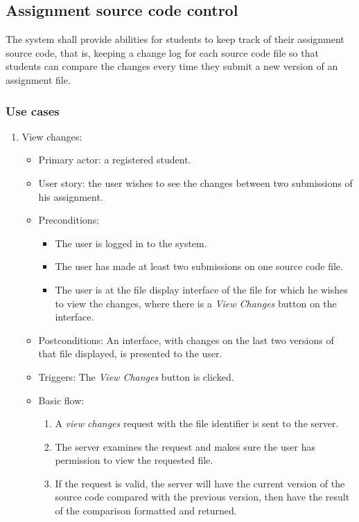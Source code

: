 \subsection{Assignment source code control}
The system shall provide abilities for students to keep track of their
assignment source code, that is, keeping a change log for each source code
file so that students can compare the changes every time they submit a new
version of an assignment file.

\subsubsection{Use cases}
\begin{enumerate}
\item View changes:
\begin{itemize}
    \item Primary actor: a registered student.
    \item User story: the user wishes to see the changes between two
        submissions of his assignment.
    \item Preconditions:
        \begin{itemize}
            \item The user is logged in to the system.
            \item The user has made at least two submissions on one source code
                file.
            \item The user is at the file display interface of the file for
                which he
                wishes to view the changes, where there is a \emph{View Changes}
                button on the interface.
        \end{itemize}
    \item Postconditions:
        An interface, with changes on the last two versions of that file
        displayed, is presented to the user.
    \item Triggers:
        The \emph{View Changes} button is clicked.
    \item Basic flow:
        \begin{enumerate}
            \item A \emph{view changes} request with the file identifier is sent
                to the server.
            \item The server examines the request and makes sure the user has
                permission to view the requested file.
            \item If the request is valid, the server will have the current
                version of the source code compared with the previous version,
                then have the result of the comparison formatted and
                returned.
        \end{enumerate}
\end{itemize}
\end{enumerate}


